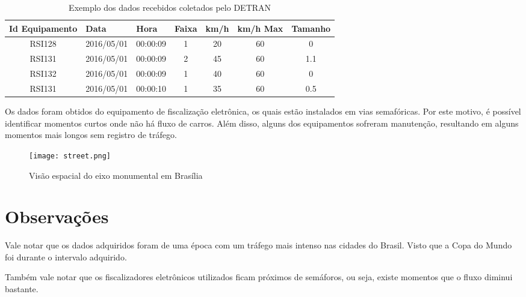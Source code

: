 \begin{table}[h]
    \begin{tabular}{ccccccc}
    \toprule
    \multicolumn{1}{l}{\textbf{Id Equipamento}} & \multicolumn{1}{l}{\textbf{Data}} & \multicolumn{1}{l}{\textbf{Hora}} & \multicolumn{1}{l}{\textbf{Faixa}} & \multicolumn{1}{l}{\textbf{km/h}} & \multicolumn{1}{l}{\textbf{km/h Max}} & \multicolumn{1}{l}{\textbf{Tamanho}} \\ 
    \midrule
    RSI128 & 2016/05/01 & 00:00:09 & 1 & 20 & 60 & 0 \\
    RSI131 & 2016/05/01 & 00:00:09 & 2 & 45 & 60 & 1.1 \\
    RSI132 & 2016/05/01 & 00:00:09 & 1 & 40 & 60 & 0 \\
    RSI131 & 2016/05/01 & 00:00:10 & 1 & 35 & 60 & 0.5 \\ 
    \bottomrule
    \end{tabular}
    \label{table:data}
    \caption{Exemplo dos dados recebidos coletados pelo \acrshort{DETRAN}}
\end{table}

Os dados foram obtidos do equipamento de fiscalização eletrônica, os quais estão instalados em vias semafóricas. Por este motivo, é possível identificar momentos curtos onde não há fluxo de carros. Além disso, alguns dos equipamentos sofreram manutenção, resultando em alguns momentos mais longos sem registro de tráfego.

\begin{figure}[t]
    \centering
    \texttt{[image: street.png]}
    \label{figure:eixo}
    \caption{Visão espacial do eixo monumental em Brasília}
\end{figure}


\section{Observações}

Vale notar que os dados adquiridos foram de uma época com um tráfego mais intenso nas cidades do Brasil. Visto que a Copa do Mundo foi durante o intervalo adquirido. 

Também vale notar que os fiscalizadores eletrônicos utilizados ficam próximos de semáforos, ou seja, existe momentos que o fluxo diminui bastante.
